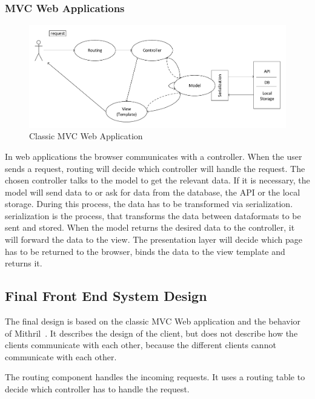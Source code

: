 \subsubsection{MVC Web Applications}

\begin{figure}[!ht]
	\includegraphics[width=\textwidth]{figures/klasszikus_mvc_webalkalmazas.pdf}
	\caption[Classic MVC Web Application]{Classic MVC Web Application~\cite{mvc-webapp}}
	\label{fig:classic-mvc-webapplication}
\end{figure}

In web applications the browser communicates with a controller. When the user sends a request, routing will decide which controller will handle the request. The chosen controller talks to the model to get the relevant data. If it is necessary, the model will send data to or ask for data from the database, the API or the local storage. During this process, the data has to be transformed via serialization. serialization is the process, that transforms the data between dataformats to be sent and stored. When the model returns the desired data to the controller, it will forward the data to the view. The presentation layer will decide which page has to be returned to the browser, binds the data to the view template and returns it.

\subsection{Final Front End System Design}

The final design is based on the classic MVC Web application  and the behavior of Mithril~\cite{Mithril-getting-started}. It describes the design of the client, but does not describe how the clients communicate with each other, because the different clients cannot communicate with each other.

The routing component handles the incoming requests. It uses a routing table to decide which controller has to handle the request.

